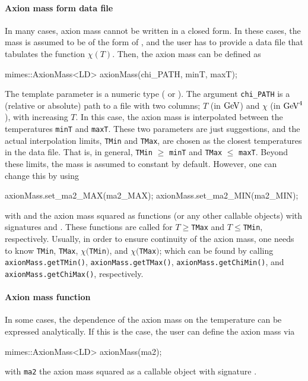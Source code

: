 \documentclass[11pt,a4paper]{article}
\begin{document}
\paragraph{Axion mass form data file} 
In many cases, axion mass cannot be written in a closed form. In these cases, the mass is assumed to be of the form of , and the user has to provide a data file that tabulates the function $\chi(T)$. Then, the axion mass can be defined as
%
\begin{cpp}
	mimes::AxionMass<LD> axionMass(chi_PATH, minT, maxT);
\end{cpp}
%
The template parameter  is a numeric type (\eg {} or ). The argument  {\tt chi\_PATH} is a (relative or absolute) path to a file with two columns; $T$ (in ${\rm GeV}$) and $\chi$ (in ${\rm GeV}^4$), with increasing $T$. In this case, the axion mass is interpolated between the temperatures {\tt minT} and {\tt maxT}. These two parameters are just suggestions, and the actual interpolation limits, {\tt  TMin} and {\tt TMax}, are chosen as the closest temperatures in the data file. That is, in general, {\tt TMin} $\geq$ {\tt minT} and {\tt TMax} $\leq$ {\tt maxT}. Beyond these limits, the mass is assumed to constant by default. However, one can change this by using 
%
\begin{cpp}
	axionMass.set_ma2_MAX(ma2_MAX);
	axionMass.set_ma2_MIN(ma2_MIN);
\end{cpp}
%
with  and  the axion mass squared as functions (or any other callable objects) with signatures  and . These functions are called for $T\geq${\tt TMax} and $T\leq${\tt TMin}, respectively. Usually, in order to ensure continuity of the axion mass, one needs to know {\tt TMin}, {\tt TMax}, $\chi(${\tt TMin}$)$, and $\chi(${\tt TMax}$)$; which can be found by calling {\tt axionMass.getTMin()}, {\tt axionMass.getTMax()}, {\tt axionMass.getChiMin()}, and {\tt axionMass.getChiMax()}, respectively.

\paragraph{Axion mass function} 
In some cases, the dependence of the axion mass on the temperature can be expressed analytically. If this is the case, the user can define the axion mass via 
%
\begin{cpp}
	mimes::AxionMass<LD> axionMass(ma2);
\end{cpp}
%
with {\tt ma2} the axion mass squared as a callable object with signature .
\end{document}
